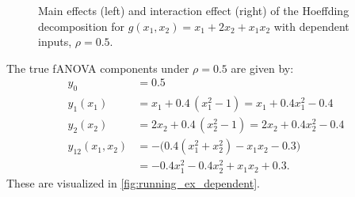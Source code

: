 \begin{figure}[htpb]
\begin{subfigure}[t]{0.49\textwidth}
    \end{subfigure}
    \caption{Main effects (left) and interaction effect (right) of the Hoeffding decomposition for $g(x_1, x_2) = x_1 + 2 x_2 + x_1 x_2$ with dependent inputs, $\rho = 0.5$.}
    \label{fig:hoeffding_rho05}
\end{figure}
The true fANOVA components under $\rho = 0.5$ are given by:
\begin{align*}
y_0 &= 0.5 \\[3pt]
y_1(x_1) &= x_1 + 0.4\,(x_1^2 - 1)
        = x_1 + 0.4x_1^2 - 0.4 \\[3pt]
y_2(x_2) &= 2x_2 + 0.4\,(x_2^2 - 1)
        = 2x_2 + 0.4x_2^2 - 0.4 \\[3pt]
y_{12}(x_1,x_2) 
&= -\Big( 0.4(x_1^2 + x_2^2) - x_1 x_2 - 0.3 \Big) \\[3pt]
&= -0.4x_1^2 - 0.4x_2^2 + x_1 x_2 + 0.3.
\end{align*}
These are visualized in \autoref{fig:running_ex_dependent}.
